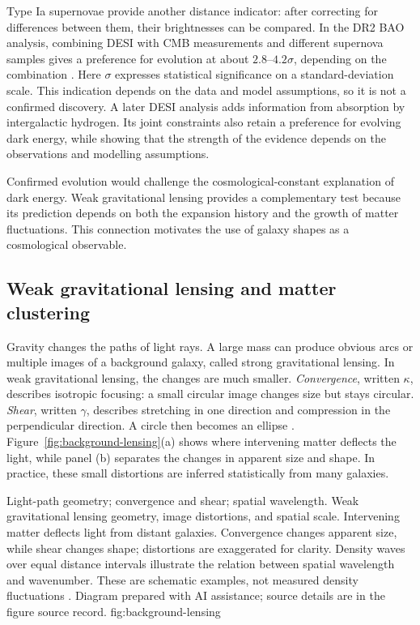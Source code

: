 Type Ia supernovae provide another distance
indicator: after correcting for differences between them, their brightnesses
can be compared. In the DR2 BAO analysis, combining DESI with CMB
measurements and different supernova samples gives a preference for evolution
at about $2.8$--$4.2\sigma$, depending on the combination
\citep{2025PhRvD.112h3515A}. Here $\sigma$ expresses statistical significance
on a standard-deviation scale. This indication depends on the data and model
assumptions, so it is not a confirmed discovery. A later DESI analysis
\citep{2026arXiv260727410D} adds information from absorption by intergalactic
hydrogen. Its joint constraints also retain a preference for evolving dark
energy, while showing that the strength of the evidence depends on the
observations and modelling assumptions.


Confirmed evolution would challenge the cosmological-constant explanation
of dark energy. Weak gravitational lensing provides a complementary test
because its prediction depends on both the expansion history and the
growth of matter fluctuations. This connection motivates the use of
galaxy shapes as a cosmological observable.

\subsection{Weak gravitational lensing and matter clustering}
\label{sec:lensing-background}

Gravity changes the paths of light rays. A large mass can produce obvious
arcs or multiple images of a background galaxy, called strong gravitational
lensing. In weak gravitational lensing, the changes are much smaller.
\emph{Convergence}, written $\kappa$, describes isotropic focusing: a small
circular image changes size but stays circular. \emph{Shear}, written
$\gamma$, describes stretching in one direction and compression in the
perpendicular direction. A circle then becomes an ellipse
\citep{2001PhR...340..291B}. Figure~\ref{fig:background-lensing}(a) shows
where intervening matter deflects the light, while panel (b) separates the
changes in apparent size and shape. In practice, these small distortions
are inferred statistically from many galaxies.

  {Light-path geometry; convergence and shear; spatial wavelength.}
  {Weak gravitational lensing geometry, image distortions, and spatial scale.
   Intervening matter deflects light from distant galaxies. Convergence changes
   apparent size, while shear changes shape; distortions are exaggerated for
   clarity. Density waves over equal distance intervals illustrate the
   relation between spatial wavelength and wavenumber. These are schematic
   examples, not measured density fluctuations \citep{2001PhR...340..291B}.
   Diagram prepared with AI assistance; source details are in the figure source record.}
  {fig:background-lensing}

